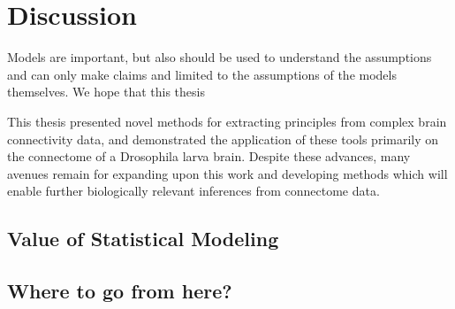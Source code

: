 \chapter{Discussion}\label{chap:discussion}
\pagebreak

Models are important, but also should be used to understand the assumptions and can only make claims and limited to the assumptions of the models themselves. We hope that this thesis

This thesis presented novel methods for extracting principles from complex brain connectivity data, and demonstrated the application of these tools primarily on the connectome of a Drosophila larva brain. Despite these advances, many avenues remain for expanding upon this work and developing methods which will enable further biologically relevant inferences from connectome data.

\section{Value of Statistical Modeling}
\blindtext

\section{Where to go from here?}
\blindtext